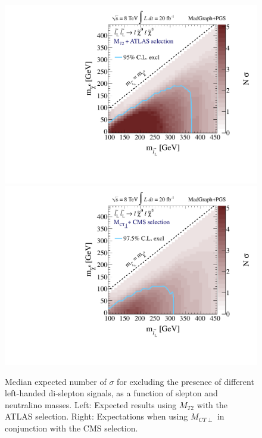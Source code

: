 \begin{figure}[ht]
\includegraphics[width=0.35\columnwidth]{fig/sectionIV/LIMIT2D_selectronL_ATLAS_MT2_CLs.pdf}
\includegraphics[width=0.35\columnwidth]{fig/sectionIV/LIMIT2D_selectronL_CMS_MCTperp_CLs.pdf}
\caption{ Median expected number of $\sigma$ for excluding the presence of different left-handed di-slepton signals, as a function of slepton and neutralino masses. Left: Expected results using $M_{T2}$ with the ATLAS selection. Right: Expectations when using $M_{CT\perp}$ in conjunction with the CMS selection.\label{fig:CLs} }
\end{figure}


